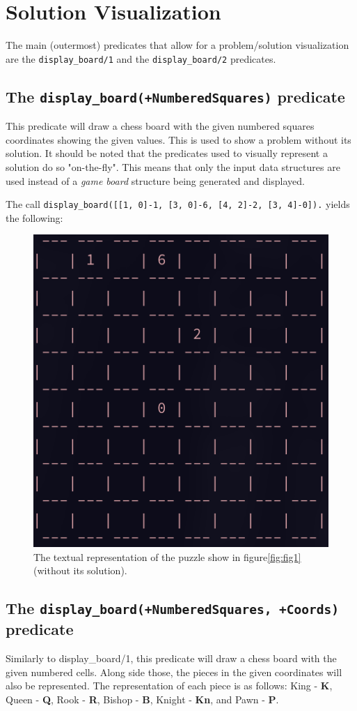 \documentclass[runningheads]{llncs}
\newcommand{\inlinecode}[1]{\texttt{#1}}
\begin{document}
\section{Solution Visualization}
The main (outermost) predicates that allow for a problem/solution visualization
are the \inlinecode{display\_board/1} and the \inlinecode{display\_board/2} predicates.

\subsection{The \inlinecode{display\_board(+NumberedSquares)} predicate}
This predicate will draw a chess board with the given numbered squares coordinates
showing the given values. This is used to show a problem without its solution. It
should be noted that the predicates used to visually represent a solution do so
"on-the-fly". This means that only the input data structures are used instead of
a \textit{game board} structure being generated and displayed.

The call \inlinecode{display\_board([[1, 0]-1, [3, 0]-6, [4, 2]-2, [3, 4]-0]).}
yields the following:
\begin{figure}[H]
  \centering
  \includegraphics[width=0.4\linewidth]{figures/display_board_1.png}
  \caption{The textual representation of the puzzle show in figure\ref{fig:fig1}
  (without its solution).}\label{fig:fig2}
\end{figure}

\subsection{The \inlinecode{display\_board(+NumberedSquares, +Coords)} predicate}
Similarly to display\_board/1, this predicate will draw a chess board with the given
numbered cells. Along side those, the pieces in the given coordinates will also be
represented. The representation of each piece is as follows: King - \textbf{K},
Queen - \textbf{Q}, Rook - \textbf{R}, Bishop - \textbf{B}, Knight - \textbf{Kn},
and Pawn - \textbf{P}.
\end{document}
